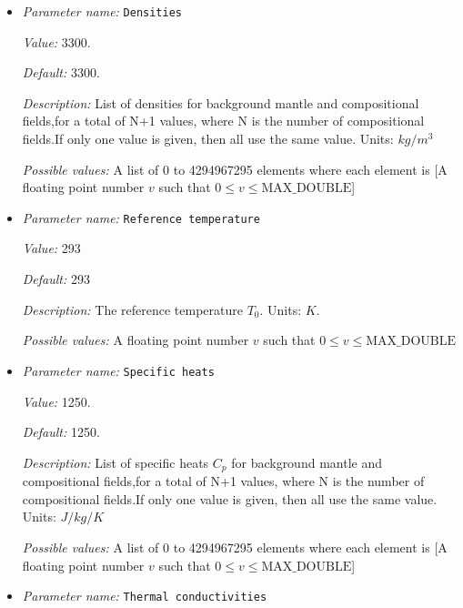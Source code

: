 \begin{itemize}
\item {\it Parameter name:} {\tt Densities}
\label{parameters:Material model/Dynamic Friction/Densities}


{\it Value:} 3300.


{\it Default:} 3300.


{\it Description:} List of densities for background mantle and compositional fields,for a total of N+1 values, where N is the number of compositional fields.If only one value is given, then all use the same value.  Units: $kg / m^3$


{\it Possible values:} A list of 0 to 4294967295 elements where each element is [A floating point number $v$ such that $0 \leq v \leq \text{MAX\_DOUBLE}$]
\item {\it Parameter name:} {\tt Reference temperature}
\label{parameters:Material model/Dynamic Friction/Reference temperature}


{\it Value:} 293


{\it Default:} 293


{\it Description:} The reference temperature $T_0$. Units: $K$.


{\it Possible values:} A floating point number $v$ such that $0 \leq v \leq \text{MAX\_DOUBLE}$
\item {\it Parameter name:} {\tt Specific heats}
\label{parameters:Material model/Dynamic Friction/Specific heats}


{\it Value:} 1250.


{\it Default:} 1250.


{\it Description:} List of specific heats $C_p$ for background mantle and compositional fields,for a total of N+1 values, where N is the number of compositional fields.If only one value is given, then all use the same value. Units: $J /kg /K$


{\it Possible values:} A list of 0 to 4294967295 elements where each element is [A floating point number $v$ such that $0 \leq v \leq \text{MAX\_DOUBLE}$]
\item {\it Parameter name:} {\tt Thermal conductivities}
\label{parameters:Material model/Dynamic Friction/Thermal conductivities}



\end{itemize}
